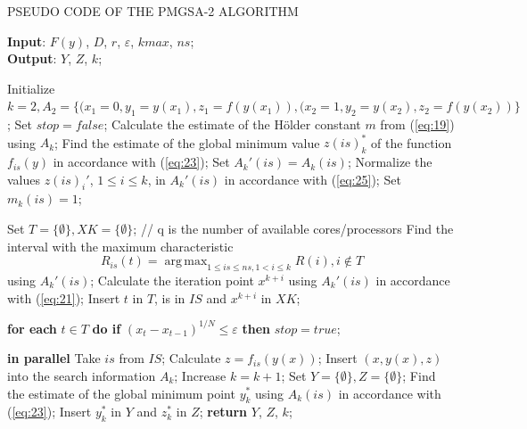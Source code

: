 \documentclass[review]{elsarticle}
\DeclareMathOperator*{\argmax}{arg\,max}
\begin{document}
\begin{algorithm}[]
\caption{PSEUDO CODE OF THE PMGSA-2 ALGORITHM} \label{alg:3}
\scriptsize
\hspace*{\algorithmicindent} \textbf{Input}: $F(y)$, $D$, $r$, $\varepsilon$, $kmax$, $ns$;\\
\hspace*{\algorithmicindent} \textbf{Output}: $Y$, $Z$, $k$;
\begin{algorithmic}[1]
\State Initialize $ k=2, A_2=\{(x_1=0,y_1=y(x_1),z_1=f(y(x_1)),(x_2=1,y_2=y(x_2),z_2=f(y(x_2))\} $;
\State Set $stop = false$;
	  \State Calculate the estimate of the H\"older constant $m$ from (\ref{eq:19}) using $A_k$;
		\State Find the estimate of the global minimum value $z(is)_k^*$ of the function $f_{is}(y)$ in accordance with (\ref{eq:23});
		\State Set $A_k'(is)=A_k (is)$;
		\State Normalize the values $z(is)_i'$, $1 \leq i \leq k$, in $A_k'(is)$ in accordance with (\ref{eq:25});
		\State Set $m_k (is)=1$;
	\EndFor
	
	\State Set $T = \{ \emptyset \}, XK = \{ \emptyset \}$;
	// q is the number of available cores/processors
	  \State Find the interval with the maximum characteristic 
		\begin{equation*}
			R_{is} (t)= \argmax_{1 \leq is \leq ns, 1 < i \leq k} R(i),i \notin T 
	  \end{equation*}
		using $A_k' (is)$;
		\State Calculate the iteration point $x^{k+i}$ using $A_k' (is)$ in accordance with (\ref{eq:21});
    \State Insert $t$ in $T$, is in $IS$ and $x^{k+i}$ in $XK$;

	\EndFor
  \State \textbf{for each} $t \in T$ \textbf{do if} $(x_t-x_{t-1} )^{1/N} \leq \varepsilon$ \textbf{then} $stop = true$;
	
	   \textbf{in parallel}
		  \State Take $is$ from $IS$;
	    \State Calculate $z = f_{is}(y(x))$;
      \State Insert $(x, y(x), z)$ into the search information $A_k$;
      \State Increase $k = k + 1$;
	  \EndFor
  \EndIf
	\State Set $Y = \{ \emptyset \}, Z = \{ \emptyset \}$;
	\State Find the estimate of the global minimum point $y_k^*$ using $A_k (is)$ in accordance with (\ref{eq:23});
	\State Insert $y_k^*$ in $Y$ and $z_k^*$ in $Z$;
  \EndFor
	\EndWhile
\State \textbf{return} $Y$, $Z$, $k$;
\end{algorithmic}
\end{algorithm}
\end{document}
